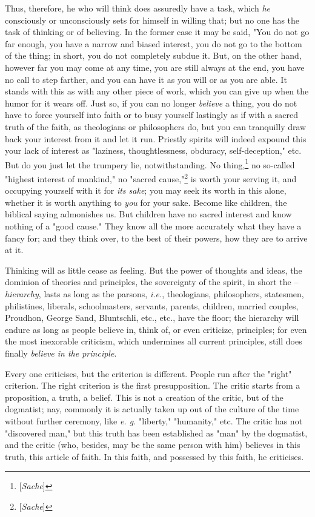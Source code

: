 \documentclass[a4paper]{book}
\begin{document}
Thus, therefore, he who will think does assuredly have a task, which 
\textit{he} consciously or unconsciously sets for himself in willing that; but 
no one has the task of thinking or of believing. In the former case it may be 
said, "{}You do not go far enough, you have a narrow and biased interest, you 
do not go to the bottom of the thing; in short, you do not completely subdue 
it. But, on the other hand, however far you may come at any time, you are 
still always at the end, you have no call to step farther, and you can have it 
as you will or as you are able. It stands with this as with any other piece of 
work, which you can give up when the humor for it wears off. Just so, if you 
can no longer \textit{believe} a thing, you do not have to force yourself into 
faith or to busy yourself lastingly as if with a sacred truth of the faith, as 
theologians or philosophers do, but you can tranquilly draw back your interest 
from it and let it run. Priestly spirits will indeed expound this your lack of 
interest as "{}laziness, thoughtlessness, obduracy, self-deception,"{} etc. 
But do you just let the trumpery lie, notwithstanding. No 
thing,\footnote{[\textit{Sache}]} no so-called "{}highest interest of 
mankind,"{} no "{}sacred cause,"{}\footnote{[\textit{Sache}]} is worth your 
serving it, and occupying yourself with it for \textit{its sake}; you may seek 
its worth in this alone, whether it is worth anything to \textit{you} for your 
sake. Become like children, the biblical saying admonishes us. But children 
have no sacred interest and know nothing of a "{}good cause."{} They know all 
the more accurately what they have a fancy for; and they think over, to the 
best of their powers, how they are to arrive at it.

Thinking will as little cease as feeling. But the power of thoughts and ideas, 
the dominion of theories and principles, the sovereignty of the spirit, in 
short the -- \textit{hierarchy}, lasts as long as the parsons, \textit{i.e.}, 
theologians, philosophers, statesmen, philistines, liberals, schoolmasters, 
servants, parents, children, married couples, Proudhon, George Sand, 
Bluntschli, etc., etc., have the floor; the hierarchy will endure as long as 
people believe in, think of, or even criticize, principles; for even the most 
inexorable criticism, which undermines all current principles, still does 
finally \textit{believe in the principle}.

Every one criticises, but the criterion is different. People run after the 
"{}right"{} criterion. The right criterion is the first presupposition. The 
critic starts from a proposition, a truth, a belief. This is not a creation of 
the critic, but of the dogmatist; nay, commonly it is actually taken up out of 
the culture of the time without further ceremony, like \textit{e. g.} 
"{}liberty,"{} "{}humanity,"{} etc. The critic has not "{}discovered man,"{} 
but this truth has been established as "{}man"{} by the dogmatist, and the 
critic (who, besides, may be the same person with him) believes in this truth, 
this article of faith. In this faith, and possessed by this faith, he 
criticises.
\end{document}

